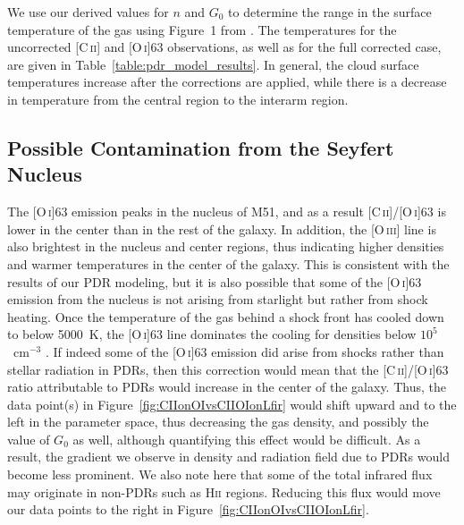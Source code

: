 We use our derived values for $n$ and $G_{0}$ to determine the range in the surface temperature of the gas using Figure~1 from \citet{1999ApJ...527..795K}.  The temperatures for the uncorrected [C\,\textsc{ii}] and [O\,\textsc{i}]63 observations, as well as for the full corrected case, are given in Table~\ref{table:pdr_model_results}.  In general, the cloud surface temperatures increase after the corrections are applied, while there is a decrease in temperature from the central region to the interarm region.

\subsection{Possible Contamination from the Seyfert Nucleus}\label{seyfert_influence}
The [O\,\textsc{i}]63 emission peaks in the nucleus of M51, and as a result [C\,\textsc{ii}]/[O\,\textsc{i}]63 is lower in the center than in the rest of the galaxy.  In addition, the [O\,\textsc{iii}] line is also brightest in the nucleus and center regions, thus indicating higher densities and warmer temperatures in the center of the galaxy.  This is consistent with the results of our PDR modeling, but it is also possible that some of the [O\,\textsc{i}]63 emission from the nucleus is not arising from starlight but rather from shock heating.  Once the temperature of the gas behind a shock front has cooled down to below 5000~K, the [O\,\textsc{i}]63 line dominates the cooling for densities below $10^{5}$~cm$^{-3}$ \citep{1989ApJ...342..306H}.  If indeed some of the [O\,\textsc{i}]63 emission did arise from shocks rather than stellar radiation in PDRs, then this correction would mean that the [C\,\textsc{ii}]/[O\,\textsc{i}]63 ratio attributable to PDRs would increase in the center of the galaxy. Thus, the data point(s) in Figure~\ref{fig:CIIonOIvsCIIOIonLfir} would shift upward and to the left in the parameter space, thus decreasing the gas density, and possibly the value of $G_{0}$ as well, although quantifying this effect would be difficult.  As a result, the gradient we observe in density and radiation field due to PDRs would become less prominent.  We also note here that some of the total infrared flux may originate in non-PDRs such as H\textsc{ii} regions.  Reducing this flux would move our data points to the right in Figure~\ref{fig:CIIonOIvsCIIOIonLfir}.

